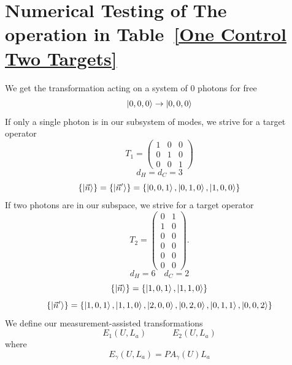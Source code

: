 \documentclass[aps,pra,twocolumn,showpacs,superscriptaddress,floatfix,10pt]{revtex4}
\begin{document}
\section{Numerical Testing of The operation in Table~\ref{One Control Two Targets}}
\label{Section Numerical Testing}
We get the transformation acting on a system of 0 photons for free
\begin{equation}
\ket{0,0,0} \rightarrow \ket{0,0,0}
\end{equation}
If only a single photon is in our subsystem of modes, we strive for a target operator
\begin{equation}
\label{T1 1C2T}
T_1=	\begin{pmatrix} 1 & 0 & 0  \\ 0 & 1 & 0  \\ 0 & 0 & 1   \end{pmatrix}  
\end{equation}
\begin{equation}
d_H = d_C = 3
\end{equation}
\begin{equation}
\{ \ket{\vec{n}} \} = \{ \ket{\vec{n}^\prime} \} = \{ \ket{0,0,1},\ket{0,1,0},\ket{1,0,0} \}
\end{equation}
If two photons are in our subspace, we strive for a target operator 
\begin{equation}
\label{T2 1C2T}
T_2=\begin{pmatrix} 0 & 1  \\ 1 & 0  \\ 0 & 0 \\ 0 & 0 \\ 0 & 0 \\ 0 & 0   \end{pmatrix}.  
\end{equation}
\begin{equation}
d_H = 6 \quad d_C = 2
\end{equation}
\begin{equation}
\{ \ket{\vec{n}} \} = \{ \ket{1,0,1},\ket{1,1,0} \}
\end{equation}
\begin{equation}
\{ \ket{\vec{n}^\prime } \} = \{ \ket{1,0,1},\ket{1,1,0},\ket{2,0,0},\ket{0,2,0},\ket{0,1,1},\ket{0,0,2} \}
\end{equation}
We define our measurement-assisted transformations 
\begin{equation}
E_1(U,L_a) \quad \quad \quad E_2(U,L_a)
\end{equation}
where
\begin{equation}
E_\gamma(U,L_a) = P A_\gamma(U) L_a
\end{equation}
\end{document}

